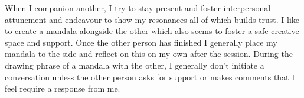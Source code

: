 When I companion another, I try to stay present and foster interpersonal attunement and endeavour to show my resonances all of which builds trust. I like to create a mandala alongside the other which also seems to foster a safe creative space and support. Once the other person has finished I generally place my mandala to the side and reflect on this on my own after the session. During the drawing phrase of a mandala with the other, I generally don't initiate a conversation unless the other person asks for support or makes comments that I feel require a response from me. 


